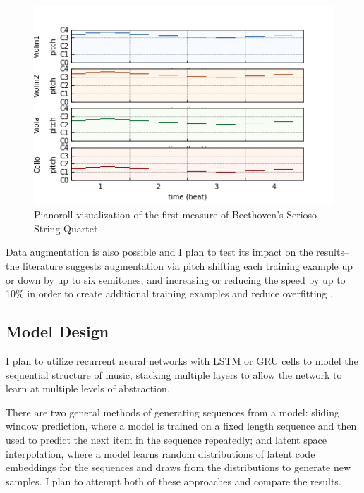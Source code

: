 \documentclass[sigconf,authorversion]{acmart}
\begin{document}
\begin{figure}[h]
  \centering
  \includegraphics[width=\linewidth]{first_bar.png}
  \caption{Pianoroll visualization of the first measure of
    Beethoven's Serioso String Quartet}
  \label{pianoroll}
\end{figure}

Data augmentation is also possible and I plan to test its impact on
the results--the literature suggests augmentation via pitch shifting
each training example up or down by up to six semitones, and
increasing or reducing the speed by up to 10\% in order to create
additional training examples and reduce overfitting
\cite{oore_this_2018}.

\subsection{Model Design}

I plan to utilize recurrent neural networks with LSTM or GRU cells to
model the sequential structure of music, stacking multiple layers to
allow the network to learn at multiple levels of abstraction.

There are two general methods of generating sequences from a model:
sliding window prediction, where a model is trained on a fixed length
sequence and then used to predict the next item in the sequence
repeatedly; and latent space interpolation, where a model learns
random distributions of latent code embeddings for the sequences and
draws from the distributions to generate new samples. I plan to
attempt both of these approaches and compare the results.
\end{document}
